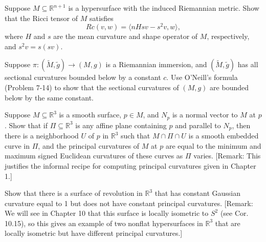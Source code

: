 \begin{exercise}
\label{prob:ricci-tensor-hypersurface}
Suppose $M \subseteq \mathbb{R}^{n+1}$ is a hypersurface with the induced Riemannian metric. Show that the Ricci tensor of $M$ satisfies
\[
Rc(v,w) = \langle nHsv - s^2v, w\rangle,
\]
where $H$ and $s$ are the mean curvature and shape operator of $M$, respectively, and $s^2v = s(sv)$.
\end{exercise}

\begin{exercise}
\label{prob:riemannian-immersion-bounded-sectional-curvatures}
Suppose $\pi: (\tilde{M}, \tilde{g}) \to (M, g)$ is a Riemannian immersion, and $(\tilde{M}, \tilde{g})$ has all sectional curvatures bounded below by a constant $c$. Use O'Neill's formula (Problem 7-14) to show that the sectional curvatures of $(M, g)$ are bounded below by the same constant.
\end{exercise}

\begin{exercise}
\label{prob:surface-affine-plane-curvature}
Suppose $M \subseteq \mathbb{R}^3$ is a smooth surface, $p \in M$, and $N_p$ is a normal vector to $M$ at $p$. Show that if $\Pi \subseteq \mathbb{R}^3$ is any affine plane containing $p$ and parallel to $N_p$, then there is a neighborhood $U$ of $p$ in $\mathbb{R}^3$ such that $M \cap \Pi \cap U$ is a smooth embedded curve in $\Pi$, and the principal curvatures of $M$ at $p$ are equal to the minimum and maximum signed Euclidean curvatures of these curves as $\Pi$ varies. [Remark: This justifies the informal recipe for computing principal curvatures given in Chapter 1.]
\end{exercise}

\begin{exercise}
\label{prob:surface-revolution-constant-gaussian-curvature}

Show that there is a surface of revolution in $\mathbb{R}^3$ that has constant Gaussian curvature equal to 1 but does not have constant principal curvatures. [Remark: We will see in Chapter 10 that this surface is locally isometric to $S^2$ (see Cor. 10.15), so this gives an example of two nonflat hypersurfaces in $\mathbb{R}^3$ that are locally isometric but have different principal curvatures.]
\end{exercise}

